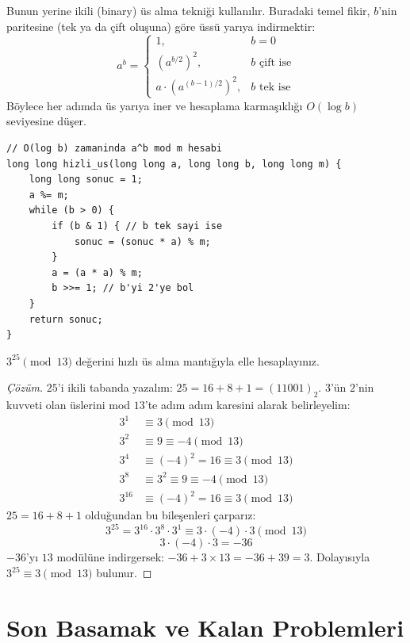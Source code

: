 Bunun yerine ikili (binary) üs alma tekniği kullanılır. Buradaki temel fikir, $b$'nin paritesine (tek ya da çift oluşuna) göre üssü yarıya indirmektir:
\[
a^b = 
\begin{cases} 
1, & b = 0 \\
(a^{b/2})^2, & b \text{ çift ise} \\
a \cdot (a^{(b-1)/2})^2, & b \text{ tek ise}
\end{cases}
\]
Böylece her adımda üs yarıya iner ve hesaplama karmaşıklığı $O(\log b)$ seviyesine düşer.

\begin{lstlisting}[language=CTemel]
// O(log b) zamaninda a^b mod m hesabi
long long hizli_us(long long a, long long b, long long m) {
    long long sonuc = 1;
    a %= m;
    while (b > 0) {
        if (b & 1) { // b tek sayi ise
            sonuc = (sonuc * a) % m;
        }
        a = (a * a) % m;
        b >>= 1; // b'yi 2'ye bol
    }
    return sonuc;
}
\end{lstlisting}

\begin{example}
$3^{25} \pmod{13}$ değerini hızlı üs alma mantığıyla elle hesaplayınız.
\end{example}

\begin{proof}[Çözüm]
$25$'i ikili tabanda yazalım: $25 = 16 + 8 + 1 = (11001)_2$.
$3$'ün $2$'nin kuvveti olan üslerini mod $13$'te adım adım karesini alarak belirleyelim:
\begin{align*}
3^1 &\equiv 3 \pmod{13} \\
3^2 &\equiv 9 \equiv -4 \pmod{13} \\
3^4 &\equiv (-4)^2 = 16 \equiv 3 \pmod{13} \\
3^8 &\equiv 3^2 \equiv 9 \equiv -4 \pmod{13} \\
3^{16} &\equiv (-4)^2 = 16 \equiv 3 \pmod{13}
\end{align*}
$25 = 16 + 8 + 1$ olduğundan bu bileşenleri çarparız:
\[
3^{25} = 3^{16} \cdot 3^8 \cdot 3^1 \equiv 3 \cdot (-4) \cdot 3 \pmod{13}
\]
\[
3 \cdot (-4) \cdot 3 = -36
\]
$-36$'yı $13$ modülüne indirgersek: $-36 + 3 \times 13 = -36 + 39 = 3$.
Dolayısıyla $3^{25} \equiv 3 \pmod{13}$ bulunur.
\end{proof}

\section{Son Basamak ve Kalan Problemleri}

